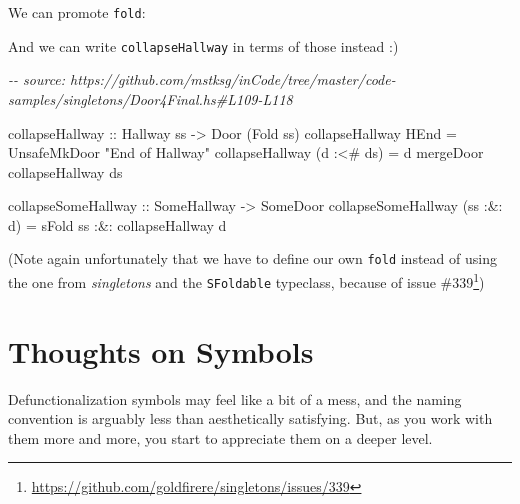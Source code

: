\documentclass[]{article}
\newenvironment{Shaded}{}{}
\newcommand{\CommentTok}[1]{\textcolor[rgb]{0.38,0.63,0.69}{\textit{#1}}}
\newcommand{\DataTypeTok}[1]{\textcolor[rgb]{0.56,0.13,0.00}{#1}}
\newcommand{\NormalTok}[1]{#1}
\newcommand{\OperatorTok}[1]{\textcolor[rgb]{0.40,0.40,0.40}{#1}}
\newcommand{\OtherTok}[1]{\textcolor[rgb]{0.00,0.44,0.13}{#1}}
\newcommand{\StringTok}[1]{\textcolor[rgb]{0.25,0.44,0.63}{#1}}
\renewcommand{\href}[2]{#2\footnote{\url{#1}}}
\begin{document}
We can promote \texttt{fold}:

\begin{Shaded}
\end{Shaded}

And we can write \texttt{collapseHallway} in terms of those instead :)

\begin{Shaded}
\begin{Highlighting}[]
\CommentTok{{-}{-} source: https://github.com/mstksg/inCode/tree/master/code{-}samples/singletons/Door4Final.hs\#L109{-}L118}

\NormalTok{collapseHallway\textquotesingle{}}
\OtherTok{    ::} \DataTypeTok{Hallway}\NormalTok{ ss}
    \OtherTok{{-}>} \DataTypeTok{Door}\NormalTok{ (}\DataTypeTok{Fold}\NormalTok{ ss)}
\NormalTok{collapseHallway\textquotesingle{} }\DataTypeTok{HEnd}       \OtherTok{=} \DataTypeTok{UnsafeMkDoor} \StringTok{"End of Hallway"}
\NormalTok{collapseHallway\textquotesingle{} (d }\OperatorTok{:<\#}\NormalTok{ ds) }\OtherTok{=}\NormalTok{ d }\OtherTok{\textasciigrave{}mergeDoor\textasciigrave{}}\NormalTok{ collapseHallway\textquotesingle{} ds}

\OtherTok{collapseSomeHallway\textquotesingle{} ::} \DataTypeTok{SomeHallway} \OtherTok{{-}>} \DataTypeTok{SomeDoor}
\NormalTok{collapseSomeHallway\textquotesingle{} (ss }\OperatorTok{:\&:}\NormalTok{ d) }\OtherTok{=}
\NormalTok{        sFold ss}
    \OperatorTok{:\&:}\NormalTok{ collapseHallway\textquotesingle{} d}
\end{Highlighting}
\end{Shaded}

(Note again unfortunately that we have to define our own \texttt{fold} instead
of using the one from \emph{singletons} and the \texttt{SFoldable} typeclass,
because of \href{https://github.com/goldfirere/singletons/issues/339}{issue
\#339})

\hypertarget{thoughts-on-symbols}{%
\section{Thoughts on Symbols}\label{thoughts-on-symbols}}

Defunctionalization symbols may feel like a bit of a mess, and the naming
convention is arguably less than aesthetically satisfying. But, as you work with
them more and more, you start to appreciate them on a deeper level.
\end{document}
